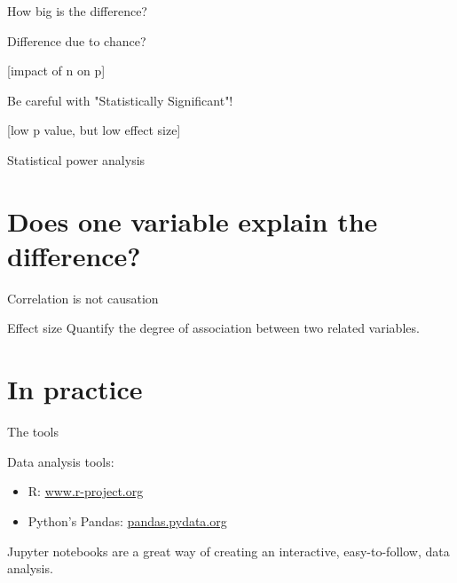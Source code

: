 \documentclass[compress]{beamer}
\begin{document}
\begin{frame}{How big is the difference?}


\end{frame}

\begin{frame}{Difference due to chance?}

    [impact of n on p]
\end{frame}


\begin{frame}{Be careful with "Statistically Significant"!}

    [low p value, but low effect size]
\end{frame}

\begin{frame}{Statistical power analysis}
\end{frame}

\section{Does one variable explain the difference?}

\begin{frame}{Correlation is not causation}
\end{frame}

\begin{frame}{Effect size}
    Quantify the degree of association between two related variables.
\end{frame}


\section{In practice}



\begin{frame}{The tools}

    Data analysis tools:

    \begin{itemize}
        \item R: \url{www.r-project.org}
        \item Python's Pandas: \url{pandas.pydata.org}
    \end{itemize}

    \pause

    Jupyter notebooks are a  great way of creating an interactive, easy-to-follow,
    data analysis.

\end{frame}
\end{document}
